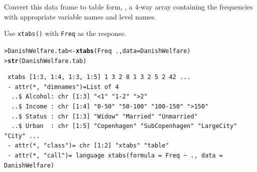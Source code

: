 \documentclass[11pt]{report}\usepackage[]{graphicx}\usepackage[]{color}
\makeatletter
\newcommand{\hlopt}[1]{\textcolor[rgb]{0,0,0}{#1}}%
\newcommand{\hlstd}[1]{\textcolor[rgb]{0.345,0.345,0.345}{#1}}%
\newcommand{\hlkwb}[1]{\textcolor[rgb]{0.69,0.353,0.396}{#1}}%
\newcommand{\hlkwc}[1]{\textcolor[rgb]{0.333,0.667,0.333}{#1}}%
\newcommand{\hlkwd}[1]{\textcolor[rgb]{0.737,0.353,0.396}{\textbf{#1}}}%
\newenvironment{kframe}{%
 \def\at@end@of@kframe{}%
 \ifinner\ifhmode%
  \def\at@end@of@kframe{\end{minipage}}%
  \begin{minipage}{\columnwidth}%
 \fi\fi%
 \def\FrameCommand##1{\hskip\@totalleftmargin \hskip-\fboxsep
 \colorbox{shadecolor}{##1}\hskip-\fboxsep
     \hskip-\linewidth \hskip-\@totalleftmargin \hskip\columnwidth}%
 \MakeFramed {\advance\hsize-\width
   \@totalleftmargin\z@ \linewidth\hsize
   \@setminipage}}%
 {\par\unskip\endMakeFramed%
 \at@end@of@kframe}
\newenvironment{knitrout}{}{} %
\renewenvironment{knitrout}{\small\renewcommand{\baselinestretch}{.85}}{} %
\makeatother
\begin{document}
\begin{Exercises}
\begin{enumerate*}
    \item Convert this data frame to table form, ,
    a 4-way array containing the
    frequencies with appropriate variable names and level names.
    \begin{ans}
      Use \texttt{xtabs()} with \texttt{Freq} as the response.
      
\begin{knitrout}
\color{fgcolor}\begin{kframe}
\begin{alltt}
\hlstd{> }\hlstd{DanishWelfare.tab} \hlkwb{<-}\hlkwd{xtabs}\hlstd{(Freq} \hlopt{~} \hlstd{.,} \hlkwc{data} \hlstd{= DanishWelfare)}
\hlstd{> }\hlkwd{str}\hlstd{(DanishWelfare.tab)}
\end{alltt}
\begin{verbatim}
 xtabs [1:3, 1:4, 1:3, 1:5] 1 3 2 8 1 3 2 5 2 42 ...
 - attr(*, "dimnames")=List of 4
  ..$ Alcohol: chr [1:3] "<1" "1-2" ">2"
  ..$ Income : chr [1:4] "0-50" "50-100" "100-150" ">150"
  ..$ Status : chr [1:3] "Widow" "Married" "Unmarried"
  ..$ Urban  : chr [1:5] "Copenhagen" "SubCopenhagen" "LargeCity" "City" ...
 - attr(*, "class")= chr [1:2] "xtabs" "table"
 - attr(*, "call")= language xtabs(formula = Freq ~ ., data = DanishWelfare)
\end{verbatim}
\end{kframe}
\end{knitrout}
    \end{ans}
    

\end{enumerate*}
\end{Exercises}
\end{document}
